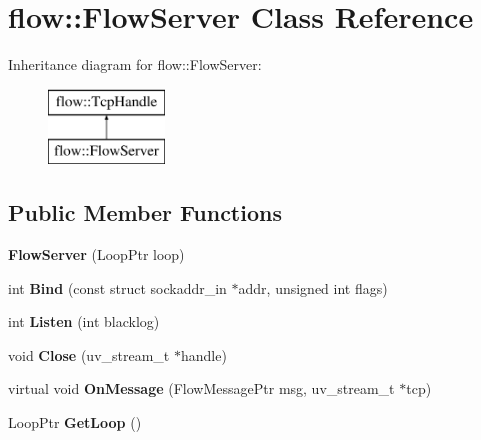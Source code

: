 \hypertarget{classflow_1_1_flow_server}{}\section{flow\+:\+:Flow\+Server Class Reference}
\label{classflow_1_1_flow_server}
Inheritance diagram for flow\+:\+:Flow\+Server\+:\begin{figure}[H]
\begin{center}
\leavevmode
\includegraphics[height=2.000000cm]{classflow_1_1_flow_server}
\end{center}
\end{figure}
\subsection*{Public Member Functions}
\begin{DoxyCompactItemize}
\item 
{\bfseries Flow\+Server} (Loop\+Ptr loop)\hypertarget{classflow_1_1_flow_server_af404150ae21b7a3aca8740cd9d621d49}{}\label{classflow_1_1_flow_server_af404150ae21b7a3aca8740cd9d621d49}

\item 
int {\bfseries Bind} (const struct sockaddr\+\_\+in $\ast$addr, unsigned int flags)\hypertarget{classflow_1_1_flow_server_a2206effa33c78de525aa2eaea475d7c0}{}\label{classflow_1_1_flow_server_a2206effa33c78de525aa2eaea475d7c0}

\item 
int {\bfseries Listen} (int blacklog)\hypertarget{classflow_1_1_flow_server_a897891d106586a8bc209591924527951}{}\label{classflow_1_1_flow_server_a897891d106586a8bc209591924527951}

\item 
void {\bfseries Close} (uv\+\_\+stream\+\_\+t $\ast$handle)\hypertarget{classflow_1_1_flow_server_aa9db6224c17592aca43ce35d36910316}{}\label{classflow_1_1_flow_server_aa9db6224c17592aca43ce35d36910316}

\item 
virtual void {\bfseries On\+Message} (Flow\+Message\+Ptr msg, uv\+\_\+stream\+\_\+t $\ast$tcp)\hypertarget{classflow_1_1_flow_server_a702f68ebe4f02cf96b8583f9cddaf627}{}\label{classflow_1_1_flow_server_a702f68ebe4f02cf96b8583f9cddaf627}

\item 
Loop\+Ptr {\bfseries Get\+Loop} ()\hypertarget{classflow_1_1_flow_server_a961e1438951482d7f80f3b6b3afa76e5}{}\label{classflow_1_1_flow_server_a961e1438951482d7f80f3b6b3afa76e5}

\end{DoxyCompactItemize}
